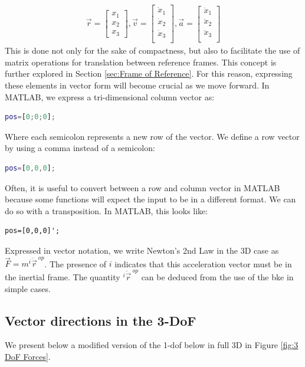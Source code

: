 \documentclass[12pt]{report}
\begin{document}
\begin{gather}
    \vec{r}=\begin{bmatrix}
        x_1\\
        x_2\\
        x_3
    \end{bmatrix},
    \vec{v}=\begin{bmatrix}
        \dot{x}_1\\
        \dot{x}_2\\
        \dot{x}_3\\
    \end{bmatrix},
        \vec{a}=\begin{bmatrix}
        \ddot{x}_1\\
        \ddot{x}_2\\
        \ddot{x}_3\\
    \end{bmatrix}
\end{gather}
This is done not only for the sake of compactness, but also to facilitate the use of matrix operations for translation between reference frames. This concept is further explored in Section \ref{sec:Frame of Reference}. For this reason, expressing these elements in vector form will become crucial as we move forward. In MATLAB, we express a tri-dimensional column vector as:
\begin{lstlisting}[language=Matlab]
pos=[0;0;0];
\end{lstlisting}
Where each semicolon represents a new row of the vector. We define a row vector by using a comma instead of a semicolon: 
\begin{lstlisting}[language=Matlab]
pos=[0,0,0];
\end{lstlisting}
Often, it is useful to convert between a row and column vector in MATLAB because some functions will expect the input to be in a different format. We can do so with a transposition. In MATLAB, this looks like: 
\begin{lstlisting}
pos=[0,0,0]';
\end{lstlisting}
Expressed in vector notation, we write Newton's 2nd Law in the 3D case as $\vec{F}=m{}^i\ddot{\vec{r}}^{\ op}$. The presence of $i$ indicates that this acceleration vector must be in the inertial frame. The quantity ${}^i\ddot{\vec{r}}^{\ op}$ can be deduced from the use of the \gls{bke} in simple cases.

\subsection{Vector directions in the 3-DoF}\label{sec: vector directions in the 3DoF}
We present below a modified version of the 1-\gls{dof} below in full 3D in Figure \ref{fig:3 DoF Forces}.
\end{document}
